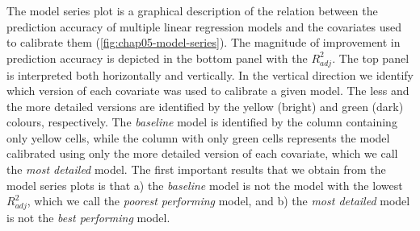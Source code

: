 The model series plot is a graphical description of the relation between the prediction accuracy of multiple 
linear regression models and the covariates used to calibrate them (\autoref{fig:chap05-model-series}). The 
magnitude of improvement in prediction accuracy is depicted in the bottom panel with the ${R}^{2}_{adj}$. The 
top panel is interpreted both horizontally and vertically. In the vertical direction we identify which version 
of each covariate was used to calibrate a given model. The less and the more detailed versions are identified 
by the yellow (bright) and green (dark) colours, respectively. The \emph{baseline} model is identified by the 
column containing only yellow cells, while the column with only green cells represents the model calibrated 
using only the more detailed version of each covariate, which we call the \emph{most detailed} model. The 
first important results that we obtain from the model series plots is that a) the \emph{baseline} model is not 
the model with the lowest ${R}^{2}_{adj}$, which we call the \emph{poorest performing} model, and b) the 
\emph{most detailed} model is not the \emph{best performing} model.

